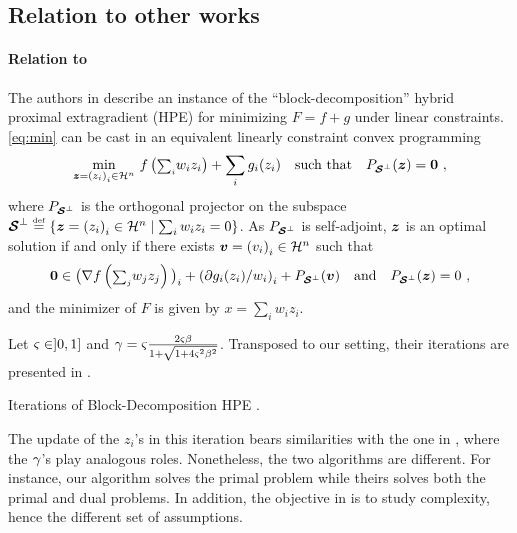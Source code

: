 \subsection{Relation to other works}
\label{sec:relations}

\paragraph{Relation to \cite{MonteiroSvaiter10}}
The authors in \cite[Section 5.3, (51)]{MonteiroSvaiter10} describe an instance of the ``block-decomposition'' hybrid proximal extragradient (HPE) for minimizing $F = f+g$ under linear constraints. \eqref{eq:min} can be cast in an equivalent linearly constraint convex programming
%
\begin{equation}\label{eq:HPE}
	\umin{\bz = \pa{z_i}_i \in \Hh^n} ~ f\pa{ \scriptstyle{\sum_i} \displaystyle w_i z_i } + \sum_i g_i(z_i) \qobjq{such that} \PSp(\bz) = \mathbf{0}~,
\end{equation}
% 
where $P_{\boldsymbol {\mathcal{S}}^\bot}$ is the orthogonal projector on the subspace $\boldsymbol {\mathcal{S}}^\bot \stackrel{\mathrm{\scriptscriptstyle{def}}}{=} \left\{  \boldsymbol z = \left( z_i \right)_i \in \mathcal{H}^n \;\middle|\; \sum_i w_i z_i = 0  \right\}$. As $P_{\boldsymbol {\mathcal{S}}^\bot}$ is self-adjoint, $\boldsymbol z$ is an optimal solution if and only if there exists $\boldsymbol v=\left( v_i \right)_i \in \mathcal{H}^n$ such that 
\[
\mathbf{0} \in \big(  \nabla f \left(  \scriptstyle{\sum_j} \displaystyle w_j z_j \right)  \big)_i + \left(  \partial g_i(z_i)/w_i  \right)_i + P_{\boldsymbol {\mathcal{S}}^\bot}(\boldsymbol v) \quad \text{and} \quad P_{\boldsymbol {\mathcal{S}}^\bot}(\boldsymbol z) = 0 ~,
\]
and the minimizer of $F$ is given by $x = \sum_i w_i z_i$.

Let $\varsigma \in ]0,1]$ and $\gamma = \varsigma \frac{2 \varsigma \beta}{1+\sqrt{1+4\varsigma^2\beta^2}}$. Transposed to our setting, their iterations are presented in .

\begin{algorithm}[h]
\caption{Iterations of Block-Decomposition HPE \cite{MonteiroSvaiter10}.}
\label{algo:HPE}
\end{algorithm}

\noindent The update of the $z_i$'s in this iteration bears similarities with the one in , where the $\gamma$'s play analogous roles. Nonetheless, the two algorithms are different. For instance, our algorithm solves the primal problem while theirs solves both the primal and dual problems. In addition, the objective in \cite{MonteiroSvaiter10} is to study complexity, hence the different set of assumptions.

